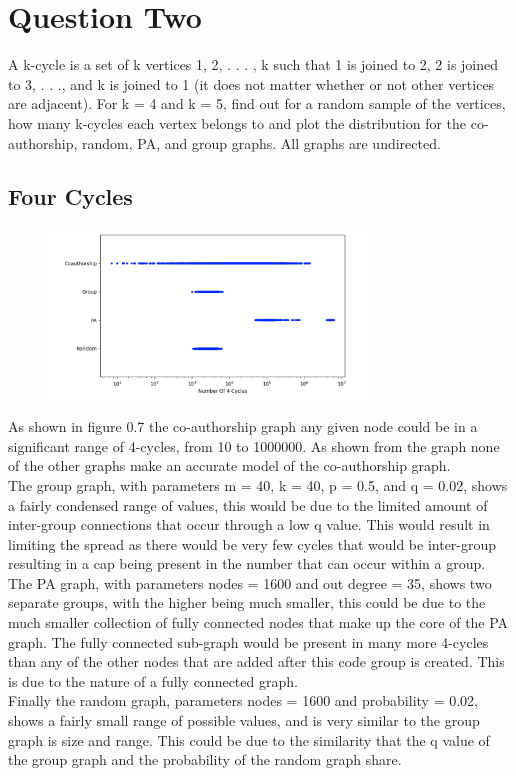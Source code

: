 \documentclass[paper=a4, fontsize=11pt]{scrartcl}
\numberwithin{equation}{section}		%
\numberwithin{figure}{section}			%
\numberwithin{table}{section}				%
\begin{document}
\section*{Question Two}

A k-cycle is a set of k vertices {1, 2, . . . , k} such that 1 is joined to 2, 2 is joined to 3, . . .,
and k is joined to 1 (it does not matter whether or not other vertices are adjacent). For k = 4 and k = 5, find out for a random sample of the vertices, how many k-cycles each vertex belongs to and plot the distribution for the co-authorship, random, PA, and group graphs. All graphs are undirected.

\subsection*{Four Cycles}

\begin{figure}[p]
\center
\caption{}
\includegraphics[width=0.75\textwidth]{pictures/4cycle.png}
\end{figure}

As shown in figure 0.7 the co-authorship graph any given node could be in a significant range of 4-cycles, from 10 to 1000000. As shown from the graph none of the other graphs make an accurate model of the co-authorship graph. \\
The group graph, with parameters m = 40, k = 40, p = 0.5, and q = 0.02, shows a fairly condensed range of values, this would be due to the limited amount of inter-group connections that occur through a low q value. This would result in limiting the spread as there would be very few cycles that would be inter-group resulting in a cap being present in the number that can occur within a group.\\
The PA graph, with parameters nodes = 1600 and out degree = 35, shows two separate groups, with the higher being much smaller, this could be due to the much smaller collection of fully connected nodes that make up the core of the PA graph. The fully connected sub-graph would be present in many more 4-cycles than any of the other nodes that are added after this code group is created. This is due to the nature of a fully connected graph. \\
Finally the random graph, parameters nodes = 1600 and probability = 0.02, shows a fairly small range of possible values, and is very similar to the group graph is size and range. This could be due to the similarity that the q value of the group graph and the probability of the random graph share. 
\end{document}
